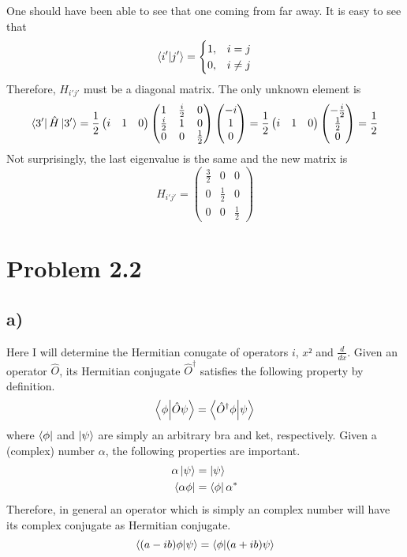 \documentclass{article}
\newcommand*\colvec[3][]{
    \begin{pmatrix}\ifx\relax#1\relax\else#1\\\fi#2\\#3\end{pmatrix}
}
\begin{document}
One should have been able to see that one coming from far away. It is easy to see that 
\begin{equation}
\braket{i'}{j'}=
\begin{cases}
1, & i=j\\
0, & i\neq j
\end{cases}
\end{equation}
Therefore, $H_{i'j'}$ must be a diagonal matrix. The only unknown element is
\begin{equation}
\bra{3'}\hat{H}\ket{3'}=
\frac{1}{2}\begin{pmatrix}
i & 1 & 0
\end{pmatrix}\begin{pmatrix}
1 & \frac{i}{2} & 0 \\
\frac{i}{2} & 1 & 0 \\
0 & 0 & \frac{1}{2}
\end{pmatrix}
\colvec[-i]{1}{0}=
\frac{1}{2}\begin{pmatrix}
i & 1 & 0
\end{pmatrix}
\colvec[-\frac{i}{2}]{\frac{1}{2}}{0}=\frac{1}{2}
\end{equation}
Not surprisingly, the last eigenvalue is the same and the new matrix is
\begin{equation}
H_{i'j'}=\begin{pmatrix}
\frac{3}{2} & 0 & 0 \\
0 & \frac{1}{2} & 0 \\
0 & 0 & \frac{1}{2}
\end{pmatrix}
\end{equation}

\section*{Problem 2.2}
\subsection*{a)}
Here I will determine the Hermitian conugate of operators $i$, $x²$ and $\frac{d}{dx}$. Given an operator $\hat{O}$, its Hermitian conjugate $\hat{O}^{\dagger}$ satisfies the following property by definition.
\begin{equation}
\label{hermconj}
\braket{\phi}{\hat{O}\psi} = \braket{\hat{O}^{\dagger}\phi}{\psi} 
\end{equation} 
where $\bra{\phi}$ and $\ket{\psi}$ are simply an arbitrary bra and ket, respectively. Given a (complex) number $\alpha$, the following properties are important.
\begin{align}
\alpha\ket{\psi} &= \ket{\psi} \\
\bra{\alpha\phi} &= \bra{\phi}\alpha^*
\end{align}
Therefore, in general an operator which is simply an complex number will have its complex conjugate as Hermitian conjugate.
\begin{equation}
\braket{(a-ib)\phi}{\psi}=\braket{\phi}{(a+ib)\psi}
\end{equation}
\end{document}
